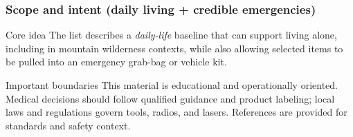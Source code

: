 

\newcommand{\DenseBodySize}{\scriptsize}   %
\newcommand{\TableBodySize}{\footnotesize} %

\newcommand{\GearTag}[1]{\textbf{#1}}


\hypersetup{colorlinks=true, linkcolor=blue, urlcolor=blue, citecolor=blue}



\begin{frame}
  \titlepage
\end{frame}

\begin{frame}
  \frametitle{Scope and intent (daily living + credible emergencies)}
  \justifying
  \begin{block}{Core idea}
    The list describes a \emph{daily-life} baseline that can support living alone, including in mountain wilderness contexts, while also allowing selected items to be pulled into an emergency grab-bag or vehicle kit.
  \end{block}

  \begin{block}{Important boundaries}
    This material is educational and operationally oriented. Medical decisions should follow qualified guidance and product labeling; local laws and regulations govern tools, radios, and lasers. References are provided for standards and safety context.
  \end{block}
\end{frame}

